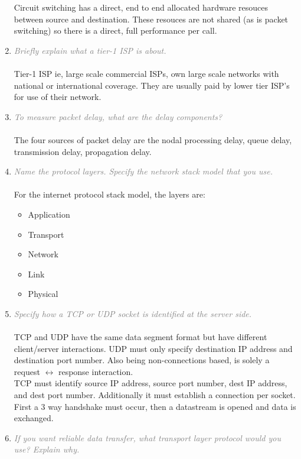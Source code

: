 \documentclass[a4paper,11pt]{article}
\begin{document}
\begin{enumerate}
Circuit switching has a direct, end to end allocated hardware resouces between source and destination.
These resouces are not shared (as is packet switching) so there is a direct, full performance per call.
\item
\textcolor{gray}{\textit{Briefly explain what a tier-1 ISP is about.}}\\ \\
Tier-1 ISP ie, large scale commercial ISPs, own large scale networks with national or international coverage. They are usually paid by lower tier ISP's for use of their network.
\item
\textcolor{gray}{\textit{To measure packet delay, what are the delay components?}}\\ \\
The four sources of packet delay are the nodal processing delay, queue delay, transmission delay, propagation delay.
\item
\textcolor{gray}{\textit{Name the protocol layers. Specify the network stack model that you use.}}\\ \\
For the internet protocol stack model, the layers are:
\begin{itemize}
	\item Application
	\item Transport
	\item Network
	\item Link
	\item Physical
\end{itemize}
\newpage
\item
\textcolor{gray}{\textit{Specify how a TCP or UDP socket is identified at the server side.}}\\ \\
TCP and UDP have the same data segment format but have different client/server interactions.
UDP must only specify destination IP address and destination port number.
Also being non-connections based, is solely a request $\leftrightarrow$ response interaction.\\
TCP must identify source IP address, source port number, dest IP address, and dest port number. Additionally it must establish a connection per socket. First a 3 way handshake must occur,
then a datastream is opened and data is exchanged.
\item
\textcolor{gray}{\textit{If you want reliable data transfer, what transport layer protocol would you use?
Explain why.}}\\ \\

\end{enumerate}
\end{document}
